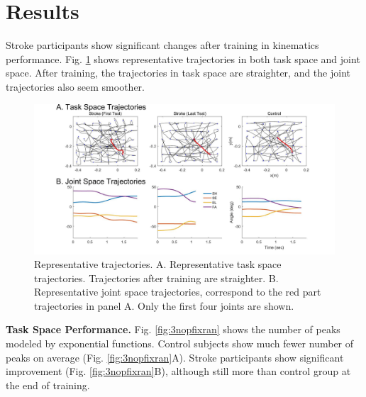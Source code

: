 \section{Results}

Stroke participants show significant changes after training in kinematics performance.
Fig. \ref{fig:2stroketrajexamp} shows representative trajectories in both task space and joint space. 
After training, the trajectories in task space are straighter, and the joint trajectories also seem smoother. 


\begin{figure}
	\centering
	\includegraphics[width=1\linewidth]{figures/2strokeTrajExamp}
	\caption[Example trajectories]
	{Representative trajectories. 
		A. Representative task space trajectories. Trajectories after training are straighter.
		B. Representative joint space trajectories, correspond to the red part trajectories in panel A. Only the first four joints are shown.}
	\label{fig:2stroketrajexamp}
\end{figure}

\textbf{Task Space Performance.}
Fig. \ref{fig:3nopfixran} shows the number of peaks modeled by exponential functions.
Control subjects show much fewer number of peaks on average (Fig. \ref{fig:3nopfixran}A).
Stroke participants show significant improvement (Fig. \ref{fig:3nopfixran}B), although still more than control group at the end of training.


